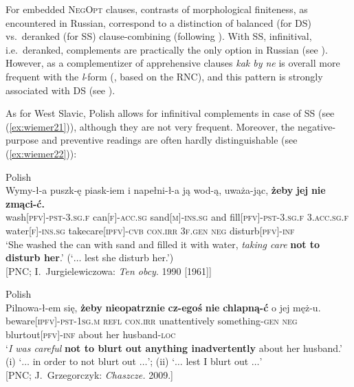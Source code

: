 \documentclass[output=paper,colorlinks,citecolor=brown]{langscibook}
\begin{document}
 For embedded \textsc{NegOpt} clauses, contrasts of morphological finiteness, as encountered in Russian, correspond to a distinction of balanced (for DS) vs.\ deranked (for SS) clause-combining (following \citealt{Cristofaro2003}). With SS, infinitival, i.e.\ de\-ranked, complements are practically the only option in Russian (see ). However, as a complementizer of apprehensive clauses \textit{kak by ne} is overall more frequent with the \textit{l}-form (\citealt[338]{Dobrushina2016}, based on the RNC), and this pattern is strongly associated with DS (see ).

As for West Slavic, Polish allows for infinitival complements in case of SS (see (\ref{ex:wiemer21})), although they are not very frequent. Moreover, the negative-purpose and preventive readings are often hardly distinguishable (see (\ref{ex:wiemer22})):


\ea \textnormal{Polish}\\
\label{ex:wiemer21} 
\gll Wymy-ł-a puszk-ę piask-iem i napełni-ł-a ją wod-ą, uważa-jąc, \textbf{żeby} \textbf{jej} \textbf{nie} \textbf{zmąci-ć.} \\
wash\textsc{[pfv]-pst-3.sg.f} can\textsc{[f]-acc.sg} sand\textsc{[m]-ins.sg} and fill\textsc{[pfv]-pst-3.sg.f} \textsc{3.acc.sg.f} water\textsc{[f]-ins.sg} take\textunderscore care\textsc{[ipfv]-cvb} \textsc{con.irr} \textsc{3f.gen} \textsc{neg} disturb\textsc{[pfv]-inf} \\
\glt `She washed the can with sand and filled it with water, \textit{taking care} \textbf{not to disturb her}.' (`$\ldots$  lest she disturb her.')\\
 {[PNC; I.\ Jurgielewiczowa: \textit{Ten obcy}. 1990 [1961]]}
\z



\begin{exe} \ex\textnormal{Polish}
\label{ex:wiemer22} \\
\gll Pilnowa-ł-em się, \textbf{żeby} \textbf{nieopatrznie} \textbf{cz-ego{\' s}} \textbf{nie} \textbf{chlapną-ć} o jej męż-u. \\
beware\textsc{[ipfv]-pst-1sg.m} \textsc{refl} \textsc{con.irr} unattentively something-\textsc{gen} \textsc{neg} blurt\textunderscore out\textsc{[pfv]-inf} about her husband-\textsc{loc} \\
\glt `\textit{I was careful} \textbf{not to blurt out anything inadvertently} about her husband.' \\
(i) `$\ldots$  in order to not blurt out $\ldots$'; (ii) `$\ldots$ lest I blurt out $\ldots$'\\ {[PNC; J.\ Grzegorczyk: \textit{Chaszcze.} 2009.]}
\end{exe}
\end{document}
